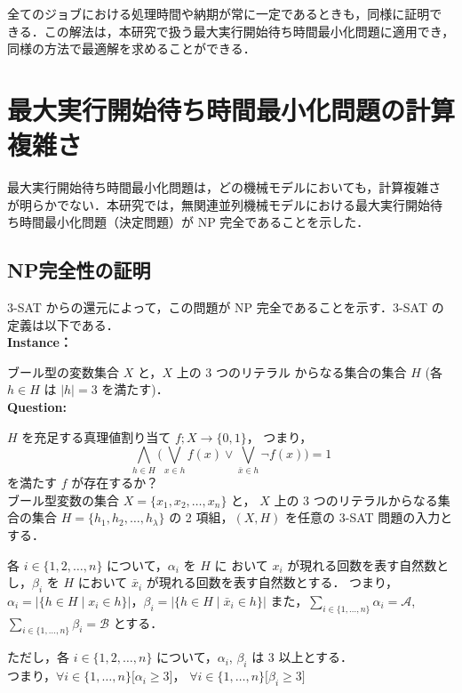 \documentclass[12pt]{optlab-bachelor}
\begin{document}
  全てのジョブにおける処理時間や納期が常に一定であるときも，同様に証明で
  きる．この解法は，本研究で扱う最大実行開始待ち時間最小化問題に適用でき，
  同様の方法で最適解を求めることができる．

  \chapter{最大実行開始待ち時間最小化問題の計算複雑さ}
  最大実行開始待ち時間最小化問題は，どの機械モデルにおいても，計算複雑さ
  が明らかでない．本研究では，無関連並列機械モデルにおける最大実行開始待
  ち時間最小化問題（決定問題）が NP 完全であることを示した．
  \section{NP完全性の証明}
  3-SAT からの還元によって，この問題が NP  完全であることを示す．3-SAT
  の定義は以下である．\\

  \noindent \textbf{Instance：}

  ブール型の変数集合 $X$ と，$X$ 上の 3 つのリテラル
  からなる集合の集合 $H$ (各 $h \in H$ は $|h| = 3$ を満たす)．\\

  \noindent \textbf{Question:}

  $H$ を充足する真理値割り当て $f ; X \to \{0,1\}$，
  つまり，
  $$\displaystyle \bigwedge_{h \in H} \bigg(\bigvee_{x \in h}f(x) \lor
  \bigvee_{\bar x \in h}\lnot f(x) \bigg) = 1$$
  を満たす $f$ が存在するか？\\

  ブール型変数の集合 $X =\{x_1, x_2,\ldots ,x_n\}$ と， $X$ 上の 3 つのリテラルからなる集合の集合 $H =\{h_1, h_2,\ldots ,h_{\lambda}\}$ の 2 項組，$(X,H)$ を任意の 3-SAT 問題の入力とする．

  各 $i \in \{1,2,\ldots, n\}$ について，$\alpha_i$ を $H$ に おいて $x_i$ が現れる回数を表す自然数とし，$\beta_i$ を $H$ において $\bar x_i$ が現れる回数を表す自然数とする．
  つまり，$\alpha_i = \big|\{h \in H \mid x_i \in h\}\big|$，$\beta_i = \big|\{h \in H \mid \bar x_i \in h\}\big|$
  また，$\displaystyle \sum_{i \in \{1,\ldots,n\}} \alpha_i = \mathcal{A}$, $\displaystyle \sum_{i \in \{1,\ldots,n\}} \beta_i = \mathcal{B}$  とする．

  ただし，各 $i \in \{1,2,\ldots, n\}$ について，$\alpha_i$, $\beta_i$ は 3 以上とする．\\
  つまり，$\forall i \in \{1,\ldots,n\}\big[\alpha_i \ge 3\big]$，
  $\forall i \in \{1,\ldots,n\}\big[\beta_i \ge 3\big]$
\end{document}
